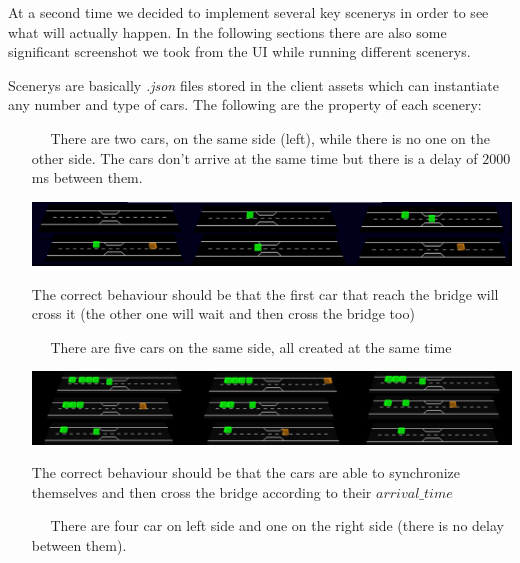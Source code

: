At a second time we decided to implement several key scenerys in order to see what will actually happen. 
In the following sections there are also some significant screenshot we took from the UI while running 
different scenerys. 

Scenerys are basically \textit{.json} files stored in the client assets which 
can instantiate any number and type of cars. 
The following are the property of each scenery:
\begin{itemize}
    \item[\fbox{scenery \textbf{1}} $\quad$] There are two cars, on the same side (left), 
    while there is no one on the other side. 
    The cars don't arrive at the same time but there is a delay of $2000$ ms between them. \\

    \begin{center}
        \includegraphics[scale=0.3, width=\linewidth]{assets/sc1.jpg}
    \end{center}

    The correct behaviour should be that the first car that reach the bridge will cross it (the other 
    one will wait and then cross the bridge too) \\
    
    \item[\fbox{scenery \textbf{2}} $\quad$] There are five cars on the same side, all 
    created at the same time \\

    \begin{center}
        \includegraphics[scale=0.3, width=\linewidth]{assets/sc2.jpg}
    \end{center}

    The correct behaviour should be that the cars are able to synchronize themselves 
    and then cross the bridge according to their $arrival\_time$ \\

    \item[\fbox{scenery \textbf{3}} $\quad$] There are four car on left side and one on the right side (there is no delay 
    between them).\\ 


\end{itemize}
